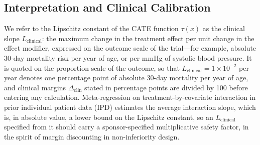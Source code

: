 \documentclass[AMA,Times1COL]{WileyNJDv5}
\begin{document}

\subsection{Interpretation and Clinical Calibration}\label{sec:inference}


We refer to the Lipschitz constant of the CATE function $\tau(x)$ as the clinical slope $L_{\text{clinical}}$: the maximum change in the treatment effect per unit change in the effect modifier, expressed on the outcome scale of the trial---for example, absolute 30-day mortality risk per year of age, or per mmHg of systolic blood pressure. It is quoted on the proportion scale of the outcome, so that $L_{\text{clinical}} = 1 \times 10^{-2}$ per year denotes one percentage point of absolute 30-day mortality per year of age, and clinical margins $\Delta_{\text{clin}}$ stated in percentage points are divided by 100 before entering any calculation. Meta-regression on treatment-by-covariate interaction in prior individual patient data (IPD) estimates the average interaction slope,\cite{riley2010,fisher2017} which is, in absolute value, a lower bound on the Lipschitz constant, so an $L_{\text{clinical}}$ specified from it should carry a sponsor-specified multiplicative safety factor, in the spirit of margin discounting in non-inferiority design.
\end{document}
